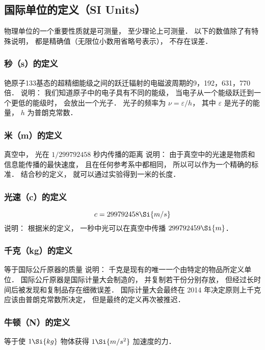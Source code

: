 
\subsection{国际单位的定义（SI Units）}

物理单位的一个重要性质就是可测量， 至少理论上可测量． 以下的数值除了有特殊说明， 都是精确值（无限位小数用省略号表示）， 不存在误差．

\subsubsection{秒（s）的定义}
铯原子133基态的超精细能级之间的跃迁辐射的电磁波周期的9，192，631，770倍． 
说明： 我们知道原子中的电子具有不同的能级， 当电子从一个能级跃迁到一个更低的能级时， 会放出一个光子． 光子的频率为 $\nu  = \varepsilon /h$，   其中 $\varepsilon $ 是光子的能量， $h$ 为普朗克常数．

\subsubsection{米（m）的定义}
真空中， 光在 $1/299792458$ 秒内传播的距离
说明： 由于真空中的光速是物质和信息能传播的最快速度， 且在任何参考系中都相同， 所以可以作为一个精确的标准． 结合秒的定义， 就可以通过实验得到一米的长度．

\subsubsection{光速（c）的定义}
 \begin{equation}
c = 299792458 \Si{m/s}
\end{equation} 
说明： 根据米的定义， 一秒中光可以在真空中传播 $299792459 \Si{m}$．  

\subsubsection{千克（kg）的定义}
等于国际公斤原器的质量
说明： 千克是现有的唯一一个由特定的物品所定义单位． 国际公斤原器是国际计量大会制造的， 并复制若干份分别存放， 但经过长时间后被发现和复制品存在细微误差． 国际计量大会最终在 2014 年决定原则上千克应该由普朗克常数所决定， 但是最终的定义再次被推迟．

\subsubsection{牛顿（N）的定义}
等于使 $1\Si{kg}$ 物体获得 $1\Si{m/s^2}$ 加速度的力．

